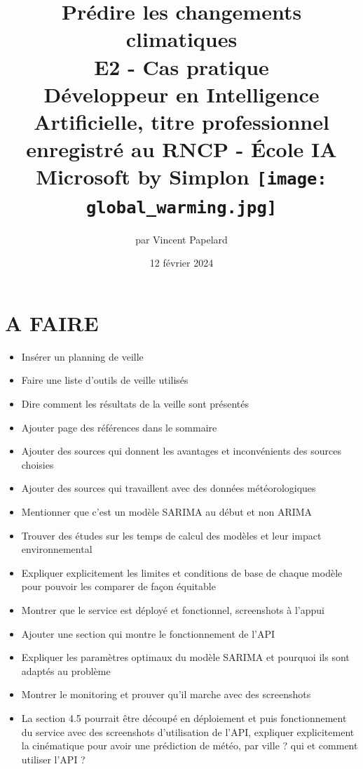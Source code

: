\documentclass[french]{article}
\title{%
    \huge Prédire les changements climatiques  \\
    \bigskip
    \large E2 - Cas pratique \\ 
    Développeur en Intelligence Artificielle,
    titre professionnel enregistré au RNCP - École IA Microsoft by Simplon
    \vfill
    \texttt{[image: global\_warming.jpg]}
    \vfill}
\date{12 février 2024}
\author{par Vincent Papelard}
\begin{document}
    \renewcommand{\contentsname}{Table des Matières}
    \renewcommand{\refname}{Références}
    \maketitle
    \newpage
    \tableofcontents
    \newpage

    \section{A FAIRE}
    \begin{itemize}
        \item Insérer un planning de veille
        \item Faire une liste d'outils de veille utilisés
        \item Dire comment les résultats de la veille sont présentés
        \item Ajouter page des références dans le sommaire
        \item Ajouter des sources qui donnent les avantages et inconvénients des sources choisies
        \item Ajouter des sources qui travaillent avec des données météorologiques
        \item Mentionner que c'est un modèle SARIMA au début et non ARIMA
        \item Trouver des études sur les temps de calcul des modèles et leur impact environnemental
        \item Expliquer explicitement les limites et conditions de base de chaque modèle pour pouvoir les comparer de façon équitable
        \item Montrer que le service est déployé et fonctionnel, screenshots à l'appui
        \item Ajouter une section qui montre le fonctionnement de l'API
        \item Expliquer les paramètres optimaux du modèle SARIMA et pourquoi ils sont adaptés au problème
        \item Montrer le monitoring et prouver qu'il marche avec des screenshots
        \item La section 4.5 pourrait être découpé en déploiement et puis fonctionnement du service avec des screenshots d'utilisation de l'API, expliquer explicitement la cinématique pour avoir une prédiction de météo, par ville ? qui et comment utiliser l'API ? 
    \end{itemize}
\end{document}
